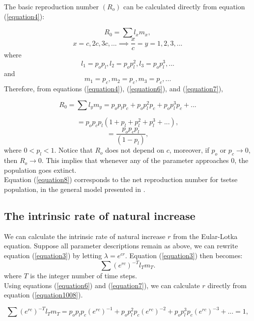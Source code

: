 \documentclass[10pt,a4paper]{article}
\begin{document}
The basic reproduction number $(R_o)$ can be calculated directly from equation (\ref{equation4}): 

$$R_{0 }=\sum l_{x}m_{x},$$
$$x=c,2c,3c,... \implies \frac{x}{c}=y = 1,2,3,...$$ 
where
\begin{equation}
\label{equation6} 
l_{1}=p_op_l, l_{2}= p_op_l^2, l_{3}=p_op_l^3, . . .
\end{equation}
and
\begin{equation}
\label{equation7} 
m_{1}=p_c, m_{2}=p_c, m_{3}=p_c, . . .
\end{equation}
Therefore, from equations (\ref{equation4}),  (\ref{equation6}), and  (\ref{equation7}),

$$R_{0 }=\sum l_{y}m_{y} = p_op_lp_c + p_op_l^2 p_c + p_op_l^3p_c + ...$$

$$=p_op_cp_l (1 + p_l + p_l^2 + p_l^3 + ...),$$
\begin{equation}
\label{equation8} 
=\frac{p_op_cp_l}{(1-p_l)},
\end{equation}
where $0 < p_l < 1$. Notice that $R_o$ does not depend on $c$, moreover, if $p_o$ or $p_c \rightarrow{0}$, then $R_o \rightarrow{0}$. This implies that whenever any of the parameter approaches $0$, the population goes extinct. \\

Equation  (\ref{equation8}) corresponds to the net reproduction number for tsetse population, in the general model presented in \cite{Are2019a}.

\subsection*{The intrinsic rate of natural increase}
We can calculate the intrinsic rate of natural increase $r$ from the  Eular-Lotka equation.  Suppose all parameter descriptions remain as above, we can rewrite equation (\ref{equation3}) by letting $\lambda= e^{cr}$. Equation (\ref{equation3}) then becomes:
\begin{equation}
\label{equation1008} 
\sum (e^{rc})^{-T}l_{T}m_{T}.
\end{equation}
where $ T $ is the integer number of time steps. \\

Using equations  (\ref{equation6}) and  (\ref{equation7}), we can calculate $r$ directly from equation (\ref{equation1008}).

$$\sum (e^{rc})^{-T}l_{T}m_{T} = p_op_lp_c(e^{rc})^{-1} + p_op_l^2p_c(e^{rc})^{-2} + p_op_l^3p_c(e^{rc})^{-3} + ...=1,$$
\end{document}
